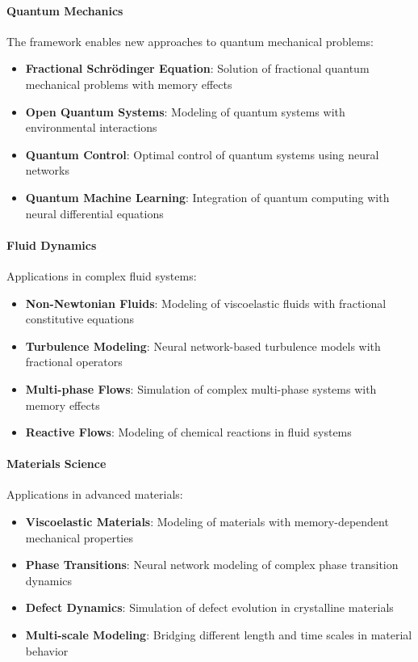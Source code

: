 \paragraph{Quantum Mechanics}
The framework enables new approaches to quantum mechanical problems:

\begin{itemize}
    \item \textbf{Fractional Schrödinger Equation}: Solution of fractional quantum mechanical problems with memory effects
    \item \textbf{Open Quantum Systems}: Modeling of quantum systems with environmental interactions
    \item \textbf{Quantum Control}: Optimal control of quantum systems using neural networks
    \item \textbf{Quantum Machine Learning}: Integration of quantum computing with neural differential equations
\end{itemize}

\paragraph{Fluid Dynamics}
Applications in complex fluid systems:

\begin{itemize}
    \item \textbf{Non-Newtonian Fluids}: Modeling of viscoelastic fluids with fractional constitutive equations
    \item \textbf{Turbulence Modeling}: Neural network-based turbulence models with fractional operators
    \item \textbf{Multi-phase Flows}: Simulation of complex multi-phase systems with memory effects
    \item \textbf{Reactive Flows}: Modeling of chemical reactions in fluid systems
\end{itemize}

\paragraph{Materials Science}
Applications in advanced materials:

\begin{itemize}
    \item \textbf{Viscoelastic Materials}: Modeling of materials with memory-dependent mechanical properties
    \item \textbf{Phase Transitions}: Neural network modeling of complex phase transition dynamics
    \item \textbf{Defect Dynamics}: Simulation of defect evolution in crystalline materials
    \item \textbf{Multi-scale Modeling}: Bridging different length and time scales in material behavior
\end{itemize}

